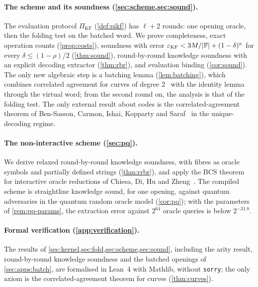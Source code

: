 \paragraph{The scheme and its soundness (\cref{sec:scheme,sec:sound}).}
The evaluation protocol $\Pi_{\mathrm{KF}}$ (\cref{def:pikf}) has $\ell + 2$ rounds: one opening oracle, then the folding test on the batched word.
We prove completeness, exact operation counts (\cref{prop:costs}), soundness with error $\varepsilon_{\mathrm{KF}} < 3M/|\mathbb{F}| + (1-\delta)^\kappa$ for every $\delta \le (1-\rho)/2$ (\cref{thm:sound}), round-by-round knowledge soundness with an explicit decoding extractor (\cref{thm:rbr}), and evaluation binding (\cref{cor:sound}).
The only new algebraic step is a batching lemma (\cref{lem:batching}), which combines correlated agreement for curves of degree $2$~\cite{BCIKS23} with the identity lemma through the virtual word; from the second round on, the analysis is that of the folding test.
The only external result about codes is the correlated-agreement theorem of Ben-Sasson, Carmon, Ishai, Kopparty and Saraf~\cite{BCIKS23} in the unique-decoding regime.

\paragraph{The non-interactive scheme (\cref{sec:pq}).}
We derive relaxed round-by-round knowledge soundness, with fibres as oracle symbols and partially defined strings (\cref{thm:rrbr}), and apply the BCS theorem for interactive oracle reductions of Chiesa, Di, Hu and Zheng~\cite{CDHZ25}. The compiled scheme is straightline knowledge sound, for one opening, against quantum adversaries in the quantum random oracle model (\cref{cor:pq}); with the parameters of \cref{rem:pq-params}, the extraction error against $2^{64}$ oracle queries is below $2^{-31.8}$.

\paragraph{Formal verification (\cref{app:verification}).}
The results of \cref{sec:kernel,sec:fold,sec:scheme,sec:sound}, including the arity result, round-by-round knowledge soundness and the batched openings of \cref{sec:apps:batch}, are formalised in Lean~4 with Mathlib, without \texttt{sorry}; the only axiom is the correlated-agreement theorem for curves (\cref{thm:curves}).

